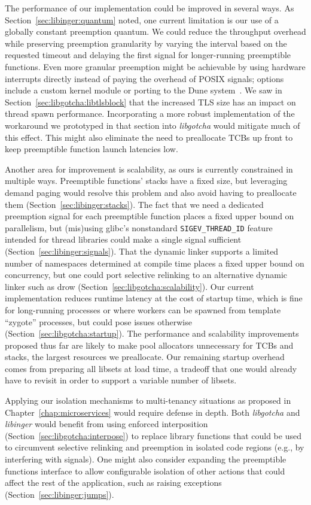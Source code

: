 The performance of our implementation could be improved in several ways.  As
Section~\ref{sec:libinger:quantum} noted, one current limitation is our use of a
globally constant preemption quantum.  We could reduce the throughput overhead while
preserving preemption granularity by varying the interval based on the requested
timeout and delaying the first signal for longer-running preemptible functions.  Even
more granular preemption might be achievable by using hardware interrupts directly
instead of paying the overhead of POSIX signals; options include a custom kernel
module or porting to the Dune system~\cite{Belay:osdi2012}.  We saw in
Section~\ref{sec:libgotcha:libtlsblock} that the increased TLS size has an impact on
thread spawn performance.  Incorporating a more robust implementation of the
workaround we prototyped in that section into \textit{libgotcha} would mitigate much
of this effect.  This might also eliminate the need to preallocate TCBs up front to
keep preemptible function launch latencies low.

Another area for improvement is scalability, as ours is currently constrained in
multiple ways.  Preemptible functions' stacks have a fixed size, but leveraging
demand paging would resolve this problem and also avoid having to preallocate them
(Section~\ref{sec:libinger:stacks}).  The fact that we need a dedicated preemption
signal for each preemptible function places a fixed upper bound on parallelism, but
(mis)using glibc's nonstandard \texttt{SIGEV\_THREAD\_ID} feature intended for thread
libraries could make a single signal sufficient (Section~\ref{sec:libinger:signals}).
That the dynamic linker supports a limited number of namespaces determined at compile
time places a fixed upper bound on concurrency, but one could port selective
relinking to an alternative dynamic linker such as drow
(Section~\ref{sec:libgotcha:scalability}).  Our current implementation reduces
runtime latency at the cost of startup time, which is fine for long-running processes
or where workers can be spawned from template ``zygote'' processes, but could pose
issues otherwise (Section~\ref{sec:libgotcha:startup}).  The performance and
scalability improvements proposed thus far are
likely to make pool allocators unnecessary for TCBs and stacks, the largest resources
we preallocate.  Our remaining startup overhead comes from preparing all libsets at
load time, a tradeoff that one would already have to revisit in order to support a
variable number of libsets.

Applying our isolation mechanisms to multi-tenancy situations as proposed in
Chapter~\ref{chap:microservices} would require defense in depth.  Both
\textit{libgotcha} and \textit{libinger} would benefit from using enforced
interposition (Section~\ref{sec:libgotcha:interpose}) to replace library functions
that could be used to circumvent selective relinking and preemption in isolated code
regions (e.g., by interfering with signals).  One might also consider expanding the
preemptible functions interface to allow configurable isolation of other actions that
could affect the rest of the application, such as raising exceptions
(Section~\ref{sec:libinger:jumps}).

